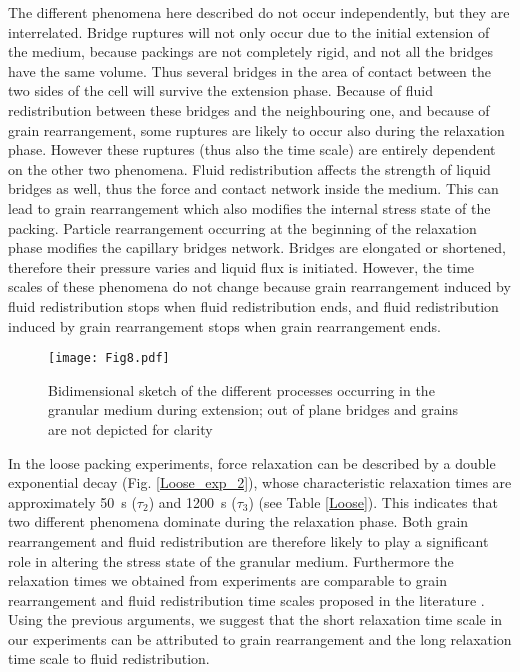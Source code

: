 The different phenomena here described do not occur independently, but they are interrelated. Bridge ruptures will not only occur due to the initial extension of the medium, because packings are not completely rigid, and not all the bridges have the same volume. Thus several bridges in the area of contact between the two sides of the cell will survive the extension phase. Because of fluid redistribution between these bridges and the neighbouring one, and because of grain rearrangement, some ruptures are likely to occur also during the relaxation phase. However these ruptures (thus also the time scale) are entirely dependent on the other two phenomena. Fluid redistribution affects the strength of liquid bridges as well, thus the force and contact network inside the medium. This can lead to grain rearrangement which also modifies the internal stress state of the packing. Particle rearrangement occurring at the beginning of the relaxation phase modifies the capillary bridges network. Bridges are elongated or shortened, therefore their pressure varies and liquid flux is initiated. However, the time scales of these phenomena do not change because grain rearrangement induced by fluid redistribution stops when fluid redistribution ends, and fluid redistribution induced by grain rearrangement stops when grain rearrangement ends.

\begin{figure*}
\texttt{[image: Fig8.pdf]}
\caption{Bidimensional sketch of the different processes occurring in the granular medium during extension; out of plane bridges and grains are not depicted for clarity}
\label{draw}
\end{figure*}

In the loose packing experiments, force relaxation can be described by a double exponential decay (Fig. \ref{Loose_exp_2}), whose characteristic relaxation times are approximately 50~\si{s} ($\tau_2$) and 1200~\si{s} ($\tau_3$) (see Table \ref{Loose}). This indicates that two different phenomena dominate during the relaxation phase. Both grain rearrangement and fluid redistribution are therefore likely to play a significant role in altering the stress state of the granular medium. Furthermore the relaxation times we obtained from experiments are comparable to grain rearrangement and fluid redistribution time scales proposed in the literature \cite{Hartley2003,Herminghaus2005,Utter2004}. Using the previous arguments, we suggest that the short relaxation time scale in our experiments can be attributed to grain rearrangement and the long relaxation time scale to fluid redistribution.

